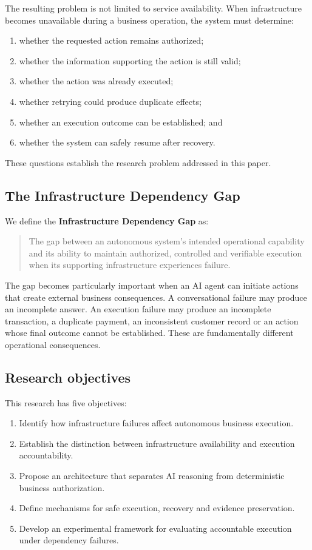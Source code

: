 \documentclass[11pt,a4paper]{article}
\begin{document}
The resulting problem is not limited to service availability. When infrastructure becomes unavailable during a business operation, the system must determine:
\begin{enumerate}[label=(\arabic*)]
  \item whether the requested action remains authorized;
  \item whether the information supporting the action is still valid;
  \item whether the action was already executed;
  \item whether retrying could produce duplicate effects;
  \item whether an execution outcome can be established; and
  \item whether the system can safely resume after recovery.
\end{enumerate}
These questions establish the research problem addressed in this paper.

\subsection{The Infrastructure Dependency Gap}

We define the \textbf{Infrastructure Dependency Gap} as:
\begin{quote}
The gap between an autonomous system's intended operational capability and its ability to maintain authorized, controlled and verifiable execution when its supporting infrastructure experiences failure.
\end{quote}

The gap becomes particularly important when an AI agent can initiate actions that create external business consequences. A conversational failure may produce an incomplete answer. An execution failure may produce an incomplete transaction, a duplicate payment, an inconsistent customer record or an action whose final outcome cannot be established. These are fundamentally different operational consequences.

\subsection{Research objectives}

This research has five objectives:
\begin{enumerate}[label=O\arabic*.]
  \item Identify how infrastructure failures affect autonomous business execution.
  \item Establish the distinction between infrastructure availability and execution accountability.
  \item Propose an architecture that separates AI reasoning from deterministic business authorization.
  \item Define mechanisms for safe execution, recovery and evidence preservation.
  \item Develop an experimental framework for evaluating accountable execution under dependency failures.
\end{enumerate}
\end{document}
